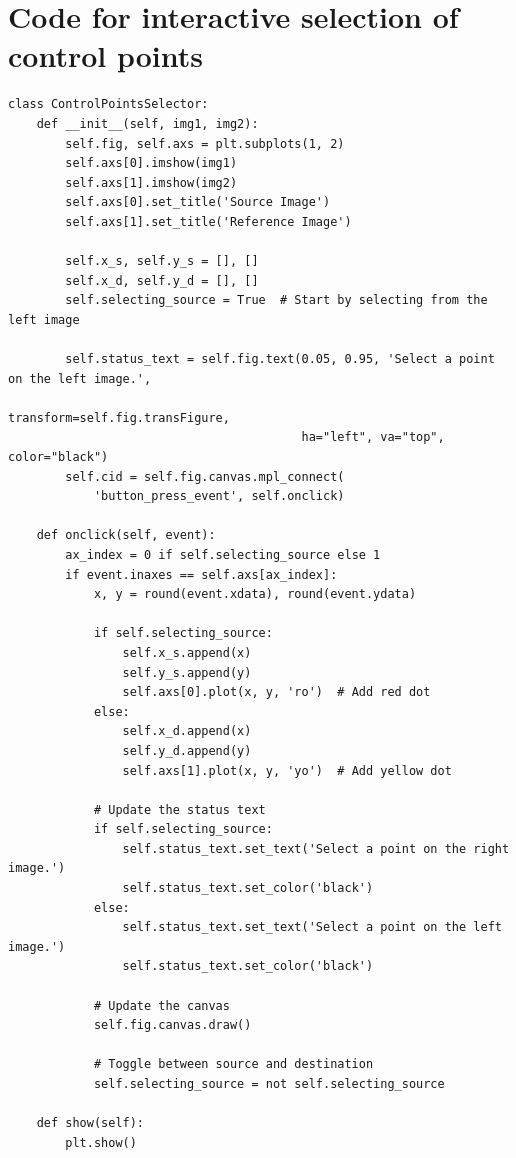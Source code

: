 \documentclass[UTF8]{ctexart}
\begin{document}
\hypertarget{code3}{\section{Code for interactive selection of control points}}
\begin{lstlisting}
class ControlPointsSelector:
    def __init__(self, img1, img2):
        self.fig, self.axs = plt.subplots(1, 2)
        self.axs[0].imshow(img1)
        self.axs[1].imshow(img2)
        self.axs[0].set_title('Source Image')
        self.axs[1].set_title('Reference Image')

        self.x_s, self.y_s = [], []
        self.x_d, self.y_d = [], []
        self.selecting_source = True  # Start by selecting from the left image

        self.status_text = self.fig.text(0.05, 0.95, 'Select a point on the left image.',
                                         transform=self.fig.transFigure,
                                         ha="left", va="top", color="black")
        self.cid = self.fig.canvas.mpl_connect(
            'button_press_event', self.onclick)

    def onclick(self, event):
        ax_index = 0 if self.selecting_source else 1
        if event.inaxes == self.axs[ax_index]:
            x, y = round(event.xdata), round(event.ydata)

            if self.selecting_source:
                self.x_s.append(x)
                self.y_s.append(y)
                self.axs[0].plot(x, y, 'ro')  # Add red dot
            else:
                self.x_d.append(x)
                self.y_d.append(y)
                self.axs[1].plot(x, y, 'yo')  # Add yellow dot

            # Update the status text
            if self.selecting_source:
                self.status_text.set_text('Select a point on the right image.')
                self.status_text.set_color('black')
            else:
                self.status_text.set_text('Select a point on the left image.')
                self.status_text.set_color('black')

            # Update the canvas
            self.fig.canvas.draw()

            # Toggle between source and destination
            self.selecting_source = not self.selecting_source

    def show(self):
        plt.show()
\end{lstlisting}
\end{document}
